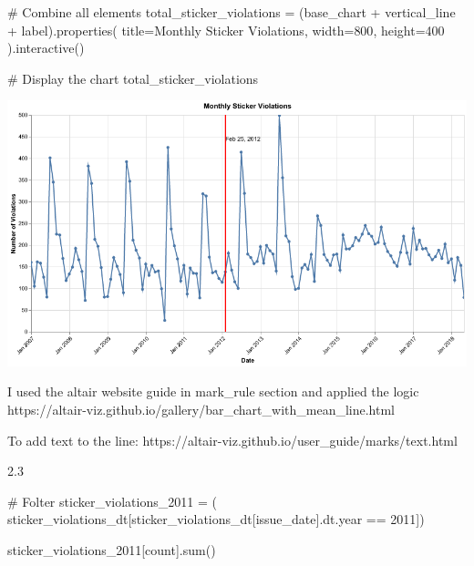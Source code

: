 \documentclass[
  letterpaper,
  DIV=11,
  numbers=noendperiod]{scrartcl}
\newenvironment{Shaded}{\begin{snugshade}}{\end{snugshade}}
\newcommand{\BuiltInTok}[1]{\textcolor[rgb]{0.00,0.23,0.31}{#1}}
\newcommand{\CommentTok}[1]{\textcolor[rgb]{0.37,0.37,0.37}{#1}}
\newcommand{\DecValTok}[1]{\textcolor[rgb]{0.68,0.00,0.00}{#1}}
\newcommand{\NormalTok}[1]{\textcolor[rgb]{0.00,0.23,0.31}{#1}}
\newcommand{\OperatorTok}[1]{\textcolor[rgb]{0.37,0.37,0.37}{#1}}
\newcommand{\StringTok}[1]{\textcolor[rgb]{0.13,0.47,0.30}{#1}}
\begin{document}
\begin{Shaded}
\begin{Highlighting}[]
\CommentTok{\# Combine all elements}
\NormalTok{total\_sticker\_violations }\OperatorTok{=}\NormalTok{ (base\_chart }\OperatorTok{+}\NormalTok{ vertical\_line }\OperatorTok{+}\NormalTok{ label).properties(}
\NormalTok{    title}\OperatorTok{=}\StringTok{\textquotesingle{}Monthly Sticker Violations\textquotesingle{}}\NormalTok{,}
\NormalTok{    width}\OperatorTok{=}\DecValTok{800}\NormalTok{,}
\NormalTok{    height}\OperatorTok{=}\DecValTok{400}
\NormalTok{).interactive()}

\CommentTok{\# Display the chart}
\NormalTok{total\_sticker\_violations}
\end{Highlighting}
\end{Shaded}

\includegraphics{ps2_answers_files/figure-pdf/cell-11-output-1.png}

I used the altair website guide in mark\_rule section and applied the
logic
https://altair-viz.github.io/gallery/bar\_chart\_with\_mean\_line.html

To add text to the line:
https://altair-viz.github.io/user\_guide/marks/text.html

2.3

\begin{Shaded}
\begin{Highlighting}[]
\CommentTok{\# Folter}
\NormalTok{sticker\_violations\_2011 }\OperatorTok{=}\NormalTok{ (}
\NormalTok{    sticker\_violations\_dt[sticker\_violations\_dt[}\StringTok{\textquotesingle{}issue\_date\textquotesingle{}}\NormalTok{].dt.year }\OperatorTok{==} \DecValTok{2011}\NormalTok{])}

\NormalTok{sticker\_violations\_2011[}\StringTok{\textquotesingle{}count\textquotesingle{}}\NormalTok{].}\BuiltInTok{sum}\NormalTok{()}
\end{Highlighting}
\end{Shaded}
\end{document}
